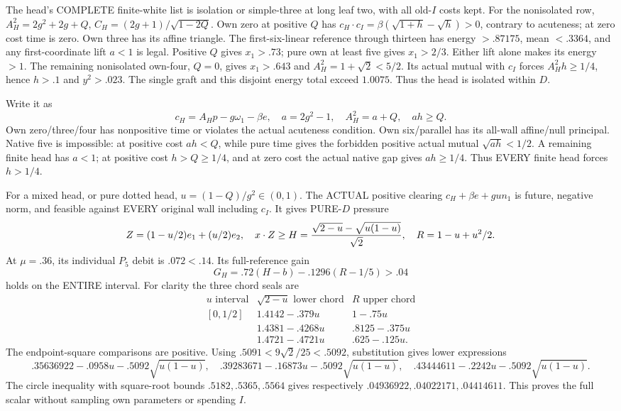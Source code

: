 The head's COMPLETE finite-white list
is isolation or simple-three at long
leaf two, with all old-\(I\) costs kept.
For the nonisolated row,
\(A_H^2=2g^2+2g+Q\),
\(C_H=(2g+1)/\sqrt{1-2Q}\).
Own zero at positive \(Q\) has
\(c_H\cdot c_I=\beta(\sqrt{1+h}-\sqrt h)>0\),
contrary to acuteness; at zero cost
time is zero.
Own three has its affine triangle.
The first-six-linear reference through
thirteen has energy \(>.87175\),
mean \(<.3364\), and any first-coordinate
lift \(a<1\) is legal.
Positive \(Q\) gives \(x_1>.73\);
pure own at least five gives
\(x_1>2/3\).
Either lift alone makes its energy \(>1\).
The remaining nonisolated own-four,
\(Q=0\), gives \(x_1>.643\) and
\(A_H^2=1+\sqrt2<5/2\).
Its actual mutual with \(c_I\) forces
\(A_H^2h\ge1/4\), hence \(h>.1\)
and \(y^2>.023\).
The single graft and this disjoint
energy total exceed \(1.0075\).
Thus the head is isolated within \(D\).

Write it as
\[
 c_H=A_Hp-g\omega_1-\beta e,\quad
 a=2g^2-1,\quad A_H^2=a+Q,\quad ah\ge Q .
\]
Own zero/three/four has nonpositive
time or violates the actual acuteness
condition.
Own six/parallel has its all-wall
affine/null principal.
Native five is impossible: at positive
cost \(ah<Q\), while pure time gives
the forbidden positive actual mutual
\(\sqrt{ah}<1/2\).
A remaining finite head has \(a<1\);
at positive cost \(h>Q\ge1/4\),
and at zero cost the actual native
gap gives \(ah\ge1/4\).
Thus EVERY finite head forces \(h>1/4\).

For a mixed head, or pure dotted head,
\(u=(1-Q)/g^2\in(0,1)\).
The ACTUAL positive clearing
\(c_H+\beta e+gu n_1\) is future,
negative norm, and feasible against
EVERY original wall including \(c_I\).
It gives PURE-\(D\) pressure
\[
 Z=(1-u/2)e_1+(u/2)e_2,\quad
 x\cdot Z\ge H={\sqrt{2-u}-\sqrt{u(1-u)}\over\sqrt2},
 \quad R=1-u+u^2/2 .
\]
At \(\mu=.36\), its individual
\(P_5\) debit is \(.072<.14\).
Its full-reference gain
\[
                     G_H=.72(H-b)-.1296(R-1/5)>.04
\tag{D16IH}\label{eq:arithD16Iheadgain}
\]
holds on the ENTIRE interval.
For clarity the three chord seals are
\[
\begin{array}{c|c|c}
 u\text{ interval}&\sqrt{2-u}\text{ lower chord}&R\text{ upper chord}\\ \hline
 [0,1/2]&1.4142-.379u&1-.75u\\
 [1/2,3/4]&1.4381-.4268u&.8125-.375u\\
 [3/4,1]&1.4721-.4721u&.625-.125u .
\end{array}
\]
The endpoint-square comparisons are positive.
Using \(.5091<9\sqrt2/25<.5092\),
substitution gives lower expressions
\[
 .35636922-.0958u-.5092\sqrt{u(1-u)},\quad
 .39283671-.16873u-.5092\sqrt{u(1-u)},\quad
 .43444611-.2242u-.5092\sqrt{u(1-u)} .
\]
The circle inequality with square-root
bounds \(.5182,.5365,.5564\)
gives respectively
\(.04936922,.04022171,.04414611\).
This proves the full scalar without
sampling own parameters or spending \(I\).

